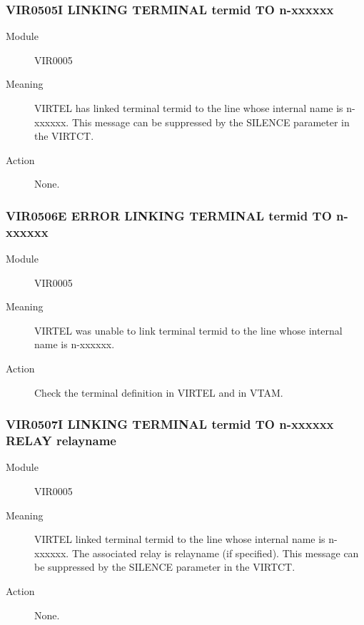 \documentclass[letterpaper,10pt,english]{sphinxmanual}
\begin{document}
\subsubsection{VIR0505I  LINKING TERMINAL termid TO n-xxxxxx}
\label{\detokenize{messages:vir0505i-linking-terminal-termid-to-n-xxxxxx}}\begin{description}
\item[{Module}] \leavevmode
VIR0005

\item[{Meaning}] \leavevmode
VIRTEL has linked terminal termid to the line whose internal name is n-xxxxxx. This message can be suppressed by the SILENCE parameter in the VIRTCT.

\item[{Action}] \leavevmode
None.

\end{description}


\subsubsection{VIR0506E ERROR LINKING TERMINAL termid TO n-xxxxxx}
\label{\detokenize{messages:vir0506e-error-linking-terminal-termid-to-n-xxxxxx}}\begin{description}
\item[{Module}] \leavevmode
VIR0005

\item[{Meaning}] \leavevmode
VIRTEL was unable to link terminal termid to the line whose internal name is n-xxxxxx.

\item[{Action}] \leavevmode
Check the terminal definition in VIRTEL and in VTAM.

\end{description}


\subsubsection{VIR0507I LINKING TERMINAL termid TO n-xxxxxx RELAY relayname}
\label{\detokenize{messages:vir0507i-linking-terminal-termid-to-n-xxxxxx-relay-relayname}}\begin{description}
\item[{Module}] \leavevmode
VIR0005

\item[{Meaning}] \leavevmode
VIRTEL linked terminal termid to the line whose internal name is n-xxxxxx. The associated relay is relayname (if specified). This message can be suppressed by the SILENCE parameter in the VIRTCT.

\item[{Action}] \leavevmode
None.

\end{description}
\end{document}
